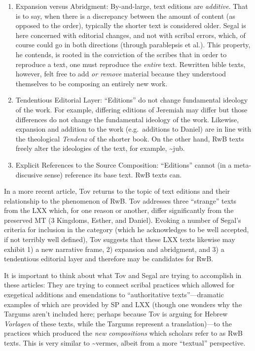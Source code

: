 \begin{enumerate}
\def\labelenumi{\arabic{enumi}.}
\setcounter{enumi}{3}
\item
  Expansion versus Abridgment: By-and-large, text editions are
  \emph{additive}. That is to say, when there is a discrepancy between
  the amount of content (as opposed to the order), typically the shorter
  text is considered older. Segal is here concerned with editorial
  changes, and not with scribal errors, which, of course could go in
  both directions (through parablepsis et al.). This property, he
  contends, is rooted in the conviction of the scribes that in order to
  reproduce a text, one must reproduce the \emph{entire}
  text.\autocite[24]{segal_henze2005} Rewritten bible texts, however,
  felt free to add \emph{or remove} material because they understood
  themselves to be composing an entirely new
  work.\autocite[24]{segal_henze2005}
\item
  Tendentious Editorial Layer: ``Editions'' do not change fundamental
  ideology of the work. For example, differing editions of Jeremiah may
  differ but those differences do not change the fundamental ideology of
  the work. Likewise, expansion and addition to the work (e.g.~additions
  to Daniel) are in line with the theological \emph{Tendenz} of the
  shorter book. On the other hand, RwB texts freely alter the ideologies
  of the text, for example,
  \textasciitilde{}jub.\autocite[25]{segal_henze2005}
\item
  Explicit References to the Source Composition: ``Editions'' cannot (in
  a meta-discusive sense) reference its base text. RwB texts can.
\end{enumerate}

In a more recent article, Tov returns to the topic of text editions and
their relationship to the phenomenon of
RwB\autocite{tov_krarrer-kraus2008}. Tov addresses three ``strange''
texts from the LXX which, for one reason or another, differ
significantly from the preserved MT (3 Kingdoms, Esther, and Daniel).
Evoking a number of Segal's criteria\autocite{segal_henze2005} for
inclusion in the category (which he acknowledges to be well accepted, if
not terribly well defined), Tov suggests that these LXX texts likewise
may exhibit 1) a new narrative frame, 2) expansion and abridgment, and
3) a tendentious editorial layer and therefore may be candidates for
RwB.

It is important to think about what Tov and Segal are trying to
accomplish in these articles: They are trying to connect scribal
practices which allowed for exegetical additions and emendations to
``authoritative texts''---dramatic examples of which are provided by SP
and LXX (though one wonders why the Targums aren't included here;
perhaps because Tov is arguing for Hebrew \emph{Vorlagen} of these
texts, while the Targums represent a translation)---to the practices
which produced the \emph{new compositions} which scholars refer to as
RwB texts. This is very similar to \textasciitilde{}vermes, albeit from
a more ``textual'' perspective.

